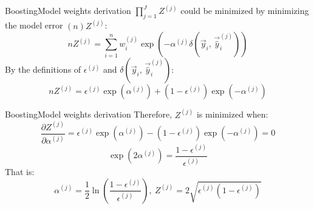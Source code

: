 \documentclass[10pt]{beamer}
\begin{document}
\begin{frame}{Boosting}{Model weights derivation}
  $\prod_{j=1}^{J} Z^{(j)}$ could be minimized by minimizing the model error $(n)$$Z^{(j)}$:
    \begin{equation*}
      n Z^{(j)}
      =
      \sum_{i = 1}^{n} w^{(j)}_i \exp(-\alpha^{(j)}\delta(\vec{y}_i,\,\vec{\hat{y}}_i^{(j)}))
    \end{equation*}
    By the definitions of $\epsilon^{(j)}$ and $\delta(\vec{y}_i,\,\vec{\hat{y}}_i^{(j)})$:
  \begin{equation*}
    n Z^{(j)}
    =
    \epsilon^{(j)} \exp(\alpha^{(j)})
    +
    (1 - \epsilon^{(j)}) \exp(-\alpha^{(j)})
  \end{equation*}
\end{frame}

\begin{frame}{Boosting}{Model weights derivation}
  Therefore, $Z^{(j)}$ is minimized when:
  \begin{equation*}
    \frac{\partial Z^{(j)}}{\partial \alpha^{(j)}}
    =
    \epsilon^{(j)} \exp(\alpha^{(j)})
    -
    (1 - \epsilon^{(j)}) \exp(-\alpha^{(j)})
    =
    0
  \end{equation*}
  \begin{equation*}
    \exp(2\alpha^{(j)})
    =
    \frac{1 - \epsilon^{(j)}}{\epsilon^{(j)}}
  \end{equation*}
  That is:
  \begin{equation*}
    \alpha^{(j)}
    =
    \frac{1}{2}\ln\left(\frac{1 - \epsilon^{(j)}}{\epsilon^{(j)}}\right)
    ,\
    Z^{(j)}
    =
    2\sqrt{\epsilon^{(j)}(1 - \epsilon^{(j)})}
  \end{equation*}
\end{frame}
\end{document}
